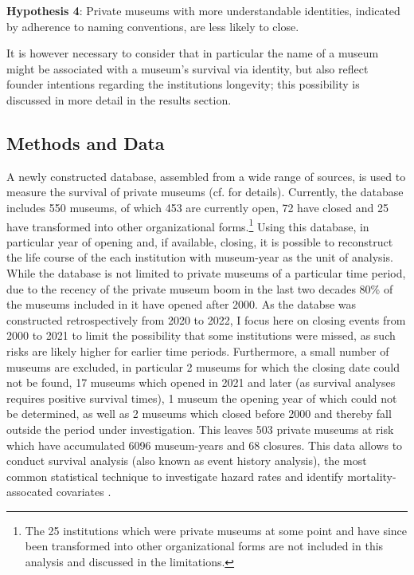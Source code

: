 \documentclass[12pt]{article}
\begin{document}
\bigbreak
\noindent
\textbf{Hypothesis 4}: Private museums with more understandable identities, indicated by adherence to naming conventions, are less likely to close. 


It is however necessary to consider that in particular the name of a museum might be associated with a museum's survival via identity, but also reflect founder intentions regarding the institutions longevity; this possibility is discussed in more detail in the results section.
\subsection*{Methods and Data}



A newly constructed database, assembled from a wide range of sources, is used to measure the survival of private museums (cf. \textcite{Velthuis_etal_2023_boom} for details).
Currently, the database includes 550 museums, of which 453 are currently open, 72 have closed and 25 have transformed into other organizational forms.\footnote{The 25 institutions which were private museums at some point and have since been transformed into other organizational forms are not included in this analysis and discussed in the limitations.}
Using this database, in particular year of opening and, if available, closing, it is possible to reconstruct the life course of the each institution with museum-year as the unit of analysis.
While the database is not limited to private museums of a particular time period, due to the recency of the private museum boom in the last two decades 80\% of the museums included in it have opened after 2000.
As the databse was constructed retrospectively from 2020 to 2022, I focus here on closing events from 2000 to 2021 to limit the possibility that some institutions were missed, as such risks are likely higher for earlier time periods.
Furthermore, a small number of museums are excluded, in particular 2 museums for which the closing date could not be found, 17 museums which opened in 2021 and later (as survival analyses requires positive survival times), 1 museum the opening year of which could not be determined, as well as 2 museums which closed before 2000 and thereby fall outside the period under investigation.
This leaves 503 private museums at risk which have accumulated 6096 museum-years and 68 closures.
This data allows to conduct survival analysis (also known as event history analysis), the most common statistical technique to investigate hazard rates and identify mortality-assocated covariates \parencite{Moore_2015_survival,Allison_2014_event}.
\end{document}
